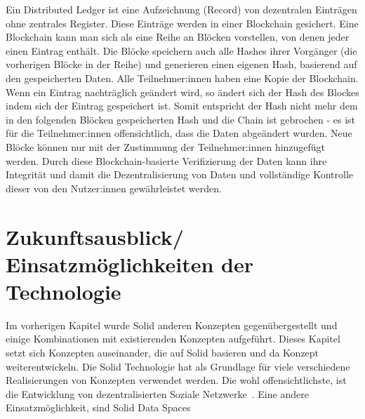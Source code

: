 \documentclass[acmtog]{acmart}
\begin{document}
Ein Distributed Ledger ist eine Aufzeichnung (Record) von dezentralen Einträgen ohne zentrales Register. Diese Einträge werden in einer Blockchain gesichert. Eine Blockchain kann man sich als eine Reihe an Blöcken vorstellen, von denen jeder einen Eintrag enthält. Die Blöcke speichern auch alle Hashes ihrer Vorgänger (die vorherigen Blöcke in der Reihe) und generieren einen eigenen Hash, basierend auf den gespeicherten Daten. Alle Teilnehmer:innen haben eine Kopie der Blockchain. Wenn ein Eintrag nachträglich geändert wird, so ändert sich der Hash des Blockes indem sich der Eintrag gespeichert ist. Somit entspricht der Hash nicht mehr dem in den folgenden Blöcken gespeicherten Hash und die Chain ist gebrochen - es ist für die Teilnehmer:innen offensichtlich, dass die Daten abgeändert wurden. Neue Blöcke können nur mit der Zustimmung der Teilnehmer:innen hinzugefügt werden.
Durch diese Blockchain-basierte Verifizierung der Daten kann ihre Integrität und damit die Dezentralisierung von Daten und vollständige Kontrolle dieser von den Nutzer:innen gewährleistet werden. ~\cite{ramachandran2020towards}

\label{section:zukunftsausblick}
\section{Zukunftsausblick/ Einsatzmöglichkeiten der Technologie}

Im vorherigen Kapitel wurde Solid anderen Konzepten gegenübergestellt und einige Kombinationen mit existierenden Konzepten aufgeführt. Dieses Kapitel setzt sich Konzepten auseinander, die auf Solid basieren und da Konzept weiterentwickeln.
Die Solid Technologie hat als Grundlage für viele verschiedene Realisierungen von Konzepten verwendet werden. Die wohl offensichtlichste, ist die Entwicklung von dezentralisierten Soziale Netzwerke~\cite{yeung2023decentralization}.
Eine andere Einsatzmöglichkeit, sind Solid Data Spaces ~\cite{meckler2023web}





\appendix
\end{document}
